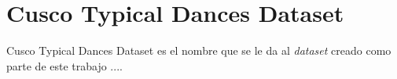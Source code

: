 \chapter{Cusco Typical Dances Dataset}
\label{cht-dataset}

Cusco Typical Dances Dataset es el nombre que se le da al \emph{dataset} creado como parte de este trabajo ....